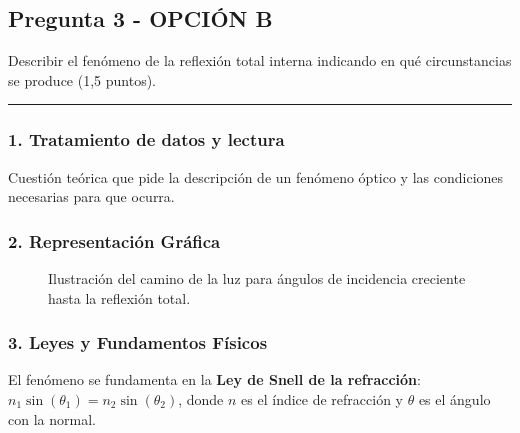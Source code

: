 \newpage

\subsection{Pregunta 3 - OPCIÓN B}
\label{subsec:3B_2007_sep_ext}

\begin{cajaenunciado}
Describir el fenómeno de la reflexión total interna indicando en qué circunstancias se produce (1,5 puntos).
\end{cajaenunciado}
\hrule

\subsubsection*{1. Tratamiento de datos y lectura}
Cuestión teórica que pide la descripción de un fenómeno óptico y las condiciones necesarias para que ocurra.

\subsubsection*{2. Representación Gráfica}
\begin{figure}[H]
    \centering
    \caption{Ilustración del camino de la luz para ángulos de incidencia creciente hasta la reflexión total.}
\end{figure}

\subsubsection*{3. Leyes y Fundamentos Físicos}
El fenómeno se fundamenta en la \textbf{Ley de Snell de la refracción}: $n_1 \sin(\theta_1) = n_2 \sin(\theta_2)$, donde $n$ es el índice de refracción y $\theta$ es el ángulo con la normal.

